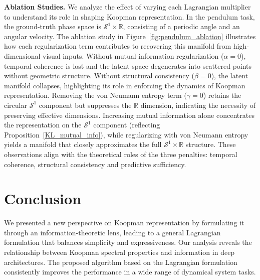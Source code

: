 \documentclass{article} %
\newcommand{\zs}[1]{\textcolor{blue}{[ZS: #1]}}
\begin{document}
\textbf{Ablation Studies.} We analyze the effect of varying each Lagrangian multiplier to understand its role in shaping Koopman representation. In the pendulum task, the ground-truth phase space is $\mathcal{S}^1 \times \mathbb{R}$, consisting of a periodic angle and an angular velocity. The ablation study in Figure~\ref{fig:pendulum_ablation} illustrates how each regularization term contributes to recovering this manifold from high-dimensional visual inputs. Without mutual information regularization ($\alpha=0$), temporal coherence is lost and the latent space degenerates into scattered points without geometric structure. Without structural consistency ($\beta=0$), the latent manifold collapses, highlighting its role in enforcing the dynamics of Koopman representation. Removing the von Neumann entropy term ($\gamma=0$) retains the circular $\mathcal{S}^1$ component but suppresses the $\mathbb{R}$ dimension, indicating the necessity of preserving effective dimensions. Increasing mutual information alone concentrates the representation on the $\mathcal{S}^1$ component (reflecting Proposition~\ref{KL_mutual_info}), while regularizing with von Neumann entropy yields a manifold that closely approximates the full $\mathcal{S}^1 \times \mathbb{R}$ structure. These observations align with the theoretical roles of the three penalties: temporal coherence, structural consistency and predictive sufficiency. 






\section{Conclusion}
We presented a new perspective on Koopman representation by formulating it through an information-theoretic lens, leading to a general Lagrangian formulation that balances simplicity and expressiveness. Our analysis reveals the relationship between Koopman spectral properties and information in deep architectures. The proposed algorithm based on the Lagrangian formulation consistently improves the performance in a wide range of dynamical system tasks. 
\end{document}
